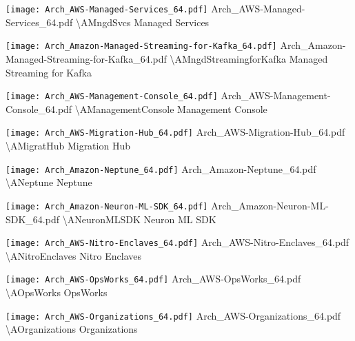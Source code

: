  {\texttt{[image: Arch\_AWS-Managed-Services\_64.pdf]}} {Arch\_AWS-Managed-Services\_64.pdf} {{\textbackslash}AMngdSvcs} {Managed Services}

 {\texttt{[image: Arch\_Amazon-Managed-Streaming-for-Kafka\_64.pdf]}} {Arch\_Amazon-Managed-Streaming-for-Kafka\_64.pdf} {{\textbackslash}AMngdStreamingforKafka} {Managed Streaming for Kafka}

 {\texttt{[image: Arch\_AWS-Management-Console\_64.pdf]}} {Arch\_AWS-Management-Console\_64.pdf} {{\textbackslash}AManagementConsole} {Management Console}

 {\texttt{[image: Arch\_AWS-Migration-Hub\_64.pdf]}} {Arch\_AWS-Migration-Hub\_64.pdf} {{\textbackslash}AMigratHub} {Migration Hub}

 {\texttt{[image: Arch\_Amazon-Neptune\_64.pdf]}} {Arch\_Amazon-Neptune\_64.pdf} {{\textbackslash}ANeptune} {Neptune}

 {\texttt{[image: Arch\_Amazon-Neuron-ML-SDK\_64.pdf]}} {Arch\_Amazon-Neuron-ML-SDK\_64.pdf} {{\textbackslash}ANeuronMLSDK} {Neuron ML SDK}

 {\texttt{[image: Arch\_AWS-Nitro-Enclaves\_64.pdf]}} {Arch\_AWS-Nitro-Enclaves\_64.pdf} {{\textbackslash}ANitroEnclaves} {Nitro Enclaves}

 {\texttt{[image: Arch\_AWS-OpsWorks\_64.pdf]}} {Arch\_AWS-OpsWorks\_64.pdf} {{\textbackslash}AOpsWorks} {OpsWorks}

 {\texttt{[image: Arch\_AWS-Organizations\_64.pdf]}} {Arch\_AWS-Organizations\_64.pdf} {{\textbackslash}AOrganizations} {Organizations}

